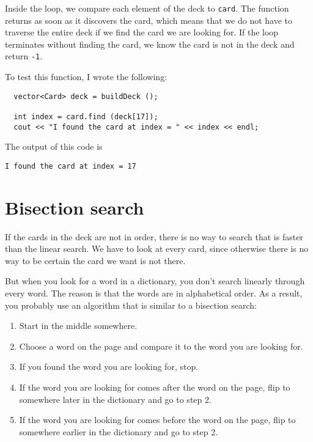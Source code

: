 Inside the loop, we compare each element of the deck to
{\tt card}.  The function returns as soon as it discovers
the card, which means that we do not have to traverse the entire
deck if we find the card we are looking for.  If the loop terminates
without finding the card, we know the card is not in the deck
and return {\tt -1}.


To test this function, I wrote the following:

\begin{verbatim}
  vector<Card> deck = buildDeck ();

  int index = card.find (deck[17]);
  cout << "I found the card at index = " << index << endl;
\end{verbatim}
%
The output of this code is

\begin{verbatim}
I found the card at index = 17
\end{verbatim}
%


\section{Bisection search}

If the cards in the deck are not in order, there is no way to search
that is faster than the linear search.  We have to look at every card,
since otherwise there is no way to be certain the card we want is not
there.

But when you look for a word in a dictionary, you don't search
linearly through every word.  The reason is that the words are in
alphabetical order.  As a result, you probably use an algorithm that
is similar to a bisection search:

\begin {enumerate}

\item Start in the middle somewhere.

\item Choose a word on the page and compare it to the word you
are looking for.

\item If you found the word you are looking for, stop.

\item If the word you are looking for comes after the word on
the page, flip to somewhere later in the dictionary and go to
step 2.

\item If the word you are looking for comes before the word on
the page, flip to somewhere earlier in the dictionary and go to
step 2.

\end {enumerate}

